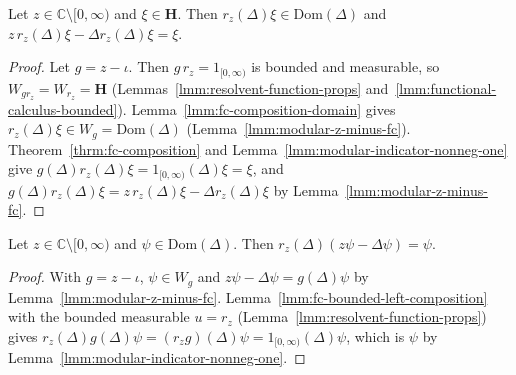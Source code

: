 \begin{lemma}
    \label{lmm:modular-resolvent-right-inverse}
    \leanok
    Let $z \in \mathbb{C} \setminus [0, \infty)$ and $\xi \in \mathbf{H}$. Then $r_z(\Delta)\xi \in \text{Dom}(\Delta)$ and $z\, r_z(\Delta)\xi - \Delta r_z(\Delta)\xi = \xi$.
\end{lemma}
\begin{proof}
    \leanok
    Let $g = z - \iota$. Then $g\,r_z = 1_{[0, \infty)}$ is bounded and measurable, so $W_{g r_z} = W_{r_z} = \mathbf{H}$ (Lemmas~\ref{lmm:resolvent-function-props} and~\ref{lmm:functional-calculus-bounded}). Lemma~\ref{lmm:fc-composition-domain} gives $r_z(\Delta)\xi \in W_g = \text{Dom}(\Delta)$ (Lemma~\ref{lmm:modular-z-minus-fc}). Theorem~\ref{thrm:fc-composition} and Lemma~\ref{lmm:modular-indicator-nonneg-one} give $g(\Delta)r_z(\Delta)\xi = 1_{[0, \infty)}(\Delta)\xi = \xi$, and $g(\Delta)r_z(\Delta)\xi = z\,r_z(\Delta)\xi - \Delta r_z(\Delta)\xi$ by Lemma~\ref{lmm:modular-z-minus-fc}.
\end{proof}

\begin{lemma}
    \label{lmm:modular-resolvent-left-inverse}
    \leanok
    Let $z \in \mathbb{C} \setminus [0, \infty)$ and $\psi \in \text{Dom}(\Delta)$. Then $r_z(\Delta)(z\psi - \Delta\psi) = \psi$.
\end{lemma}
\begin{proof}
    \leanok
    With $g = z - \iota$, $\psi \in W_g$ and $z\psi - \Delta\psi = g(\Delta)\psi$ by Lemma~\ref{lmm:modular-z-minus-fc}. Lemma~\ref{lmm:fc-bounded-left-composition} with the bounded measurable $u = r_z$ (Lemma~\ref{lmm:resolvent-function-props}) gives $r_z(\Delta)g(\Delta)\psi = (r_z g)(\Delta)\psi = 1_{[0, \infty)}(\Delta)\psi$, which is $\psi$ by Lemma~\ref{lmm:modular-indicator-nonneg-one}.
\end{proof}


